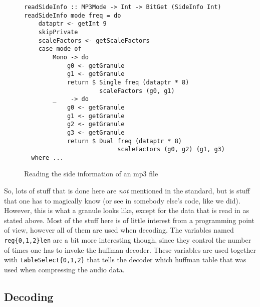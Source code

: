 \documentclass[a4paper,12pt]{article}
\begin{document}
\begin{figure}[H]
  \begin{center}
    \begin{lstlisting}
readSideInfo :: MP3Mode -> Int -> BitGet (SideInfo Int)
readSideInfo mode freq = do
    dataptr <- getInt 9
    skipPrivate
    scaleFactors <- getScaleFactors
    case mode of
        Mono -> do
            g0 <- getGranule
            g1 <- getGranule
            return $ Single freq (dataptr * 8)
                     scaleFactors (g0, g1)
        _    -> do
            g0 <- getGranule
            g1 <- getGranule
            g2 <- getGranule
            g3 <- getGranule
            return $ Dual freq (dataptr * 8)
                          scaleFactors (g0, g2) (g1, g3)
  where ...
    \end{lstlisting}
    \caption{Reading the side information of an mp3 file}\label{fig:sideinfo}
  \end{center}
\end{figure}

    So, lots of stuff that is done here are \textit{not} mentioned in the
    standard, but is stuff that one has to magically know (or see in somebody
    else's code, like we did). However, this is what a granule looks like,
    except for the data that is read in as stated above. Most of the stuff here
    is of little interest from a programming point of view, however all of them
    are used when decoding. The variables named \texttt{reg\{0,1,2\}len} are a
    bit more interesting though, since they control the number of times one has
    to invoke the huffman decoder. These variables are used together with
    \texttt{tableSelect\{0,1,2\}} that tells the decoder which huffman table
    that was used when compressing the audio data.

    \subsection{Decoding}
\end{document}
